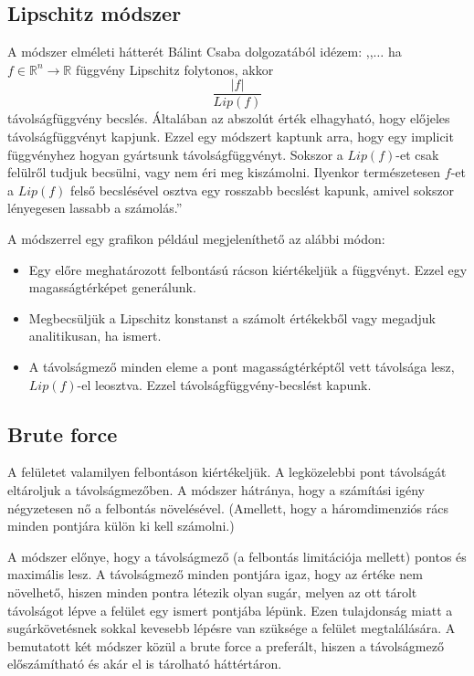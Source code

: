 \subsection{Lipschitz módszer}
A módszer elméleti hátterét Bálint Csaba dolgozatából \cite[18. o.]{BalintCsaba} idézem: ,,$\dots$ ha $f \in \mathbb{R}^n \rightarrow \mathbb{R}$ függvény Lipschitz folytonos, akkor
$$ \frac{|f|}{Lip(f)} $$
távolságfüggvény becslés. Általában az abszolút érték elhagyható, hogy előjeles távolságfüggvényt kapjunk. Ezzel egy módszert kaptunk arra, hogy egy implicit függvényhez hogyan gyártsunk távolságfüggvényt. Sokszor a $Lip(f)$-et csak felülről tudjuk becsülni, vagy nem éri meg kiszámolni. Ilyenkor természetesen $f$-et a $Lip(f)$ felső becslésével osztva egy rosszabb becslést kapunk, amivel sokszor lényegesen lassabb a számolás.''

A módszerrel egy grafikon például megjeleníthető az alábbi módon:
\begin{itemize}
	\item Egy előre meghatározott felbontású rácson kiértékeljük a függvényt. Ezzel egy magasságtérképet generálunk.
	\item Megbecsüljük a Lipschitz konstanst a számolt értékekből vagy megadjuk analitikusan, ha ismert.
	\item A távolságmező minden eleme a pont magasságtérképtől vett távolsága lesz, $Lip(f)$-el leosztva. Ezzel távolságfüggvény-becslést kapunk.
\end{itemize}

\subsection{Brute force}
A felületet valamilyen felbontáson kiértékeljük. A legközelebbi pont távolságát eltároljuk a távolságmezőben. A módszer hátránya, hogy a számítási igény négyzetesen nő a felbontás növelésével. (Amellett, hogy a háromdimenziós rács minden pontjára külön ki kell számolni.)

A módszer előnye, hogy a távolságmező (a felbontás limitációja mellett) pontos és maximális lesz. A távolságmező minden pontjára igaz, hogy az értéke nem növelhető, hiszen minden pontra létezik olyan sugár, melyen az ott tárolt távolságot lépve a felület egy ismert pontjába lépünk. Ezen tulajdonság miatt a sugárkövetésnek sokkal kevesebb lépésre van szüksége a felület megtalálására. A bemutatott két módszer közül a brute force a preferált, hiszen a távolságmező előszámítható és akár el is tárolható háttértáron.


